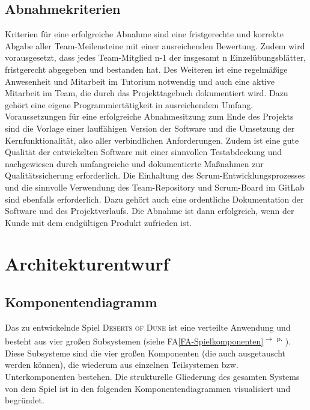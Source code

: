 \documentclass[12pt]{article}
\newcounter{fa}
\newcounter{nfa}
\newcommand{\faref}[1]{FA\ref{#1}\textsuperscript{$\rightarrow$ p. \pageref{#1}}}
\begin{document}
\subsection{Abnahmekriterien}

Kriterien für eine erfolgreiche Abnahme sind eine fristgerechte und korrekte Abgabe aller Team-Meilensteine mit einer ausreichenden Bewertung. Zudem wird vorausgesetzt, dass jedes Team-Mitglied n-1 der insgesamt n Einzelübungsblätter, fristgerecht abgegeben und bestanden hat.
Des Weiteren ist eine regelmäßige Anwesenheit und Mitarbeit im Tutorium notwendig und auch eine aktive Mitarbeit im Team, die durch das Projekttagebuch dokumentiert wird. Dazu gehört eine eigene Programmiertätigkeit in ausreichendem Umfang.
Voraussetzungen für eine erfolgreiche Abnahmesitzung zum Ende des Projekts sind die Vorlage einer lauffähigen Version der Software und die Umsetzung der Kernfunktionalität, also aller verbindlichen Anforderungen. Zudem ist eine gute Qualität der entwickelten Software mit einer sinnvollen Testabdeckung und nachgewiesen durch umfangreiche und dokumentierte Maßnahmen zur Qualitätssicherung erforderlich. Die Einhaltung des Scrum-Entwicklungsprozesses und die sinnvolle Verwendung des Team-Repository und Scrum-Board im GitLab sind ebenfalls erforderlich. Dazu gehört auch eine ordentliche Dokumentation der Software und des Projektverlaufs.
Die Abnahme ist dann erfolgreich, wenn der Kunde mit dem endgültigen Produkt zufrieden ist.


\newpage

\flushleft

\section{Architekturentwurf}

\subsection{Komponentendiagramm}
\label{ssec:Komponentendiagramm}
Das zu entwickelnde Spiel \textsc{Deserts of Dune} ist eine verteilte Anwendung und besteht aus vier großen Subsystemen (siehe \faref{FA-Spielkomponenten}). Diese Subsysteme sind die vier großen Komponenten (die auch ausgetauscht werden können), die wiederum aus einzelnen Teilsystemen bzw. Unterkomponenten bestehen. Die strukturelle Gliederung des gesamten Systems von dem Spiel ist in den folgenden Komponentendiagrammen visualisiert und begründet. 

\vspace{0.7cm}
\end{document}
